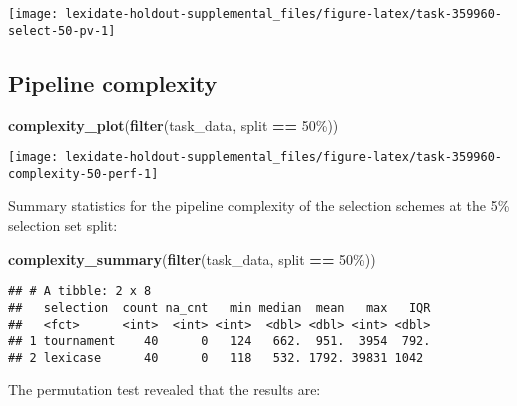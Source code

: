 \documentclass[
]{book}
\newenvironment{Shaded}{\begin{snugshade}}{\end{snugshade}}
\newcommand{\FunctionTok}[1]{\textcolor[rgb]{0.13,0.29,0.53}{\textbf{#1}}}
\newcommand{\NormalTok}[1]{#1}
\newcommand{\SpecialCharTok}[1]{\textcolor[rgb]{0.81,0.36,0.00}{\textbf{#1}}}
\newcommand{\StringTok}[1]{\textcolor[rgb]{0.31,0.60,0.02}{#1}}
\begin{document}
\texttt{[image: lexidate-holdout-supplemental\_files/figure-latex/task-359960-select-50-pv-1]}

\hypertarget{pipeline-complexity-45}{%
\subsection{Pipeline complexity}\label{pipeline-complexity-45}}

\begin{Shaded}
\begin{Highlighting}[]
\FunctionTok{complexity\_plot}\NormalTok{(}\FunctionTok{filter}\NormalTok{(task\_data, split }\SpecialCharTok{==} \StringTok{\textquotesingle{}50\%\textquotesingle{}}\NormalTok{))}
\end{Highlighting}
\end{Shaded}

\texttt{[image: lexidate-holdout-supplemental\_files/figure-latex/task-359960-complexity-50-perf-1]}

Summary statistics for the pipeline complexity of the selection schemes at the 5\% selection set split:

\begin{Shaded}
\begin{Highlighting}[]
\FunctionTok{complexity\_summary}\NormalTok{(}\FunctionTok{filter}\NormalTok{(task\_data, split }\SpecialCharTok{==} \StringTok{\textquotesingle{}50\%\textquotesingle{}}\NormalTok{))}
\end{Highlighting}
\end{Shaded}

\begin{verbatim}
## # A tibble: 2 x 8
##   selection  count na_cnt   min median  mean   max   IQR
##   <fct>      <int>  <int> <int>  <dbl> <dbl> <int> <dbl>
## 1 tournament    40      0   124   662.  951.  3954  792.
## 2 lexicase      40      0   118   532. 1792. 39831 1042
\end{verbatim}

The permutation test revealed that the results are:
\end{document}
